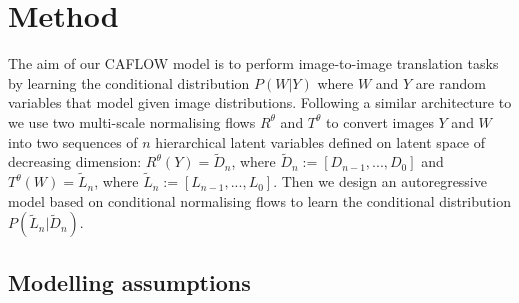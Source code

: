 \section{Method}\label{ch1:sec:Caflow}
The aim of our CAFLOW model is to perform image-to-image translation tasks by learning the conditional distribution $P(W|Y)$ where $W$ and $Y$ are random variables that model given image distributions.
Following a similar architecture to \cite{Dual-Glow} we use two multi-scale normalising flows $R^\theta$ and $T^\theta$ to convert images $Y$ and $W$ into two sequences of $n$ hierarchical latent variables defined on latent space of decreasing dimension: \(R^\theta(Y)=\tilde{D}_n\), where \(\tilde{D}_n:=[D_{n-1}, ..., D_0]\) and \(T^\theta(W)=\tilde{L}_n\), where \(\tilde{L}_n := [L_{n-1}, ..., L_0]\). Then we design an autoregressive model based on conditional normalising flows to learn the conditional distribution $P(\tilde{L}_n| \tilde{D}_n)$.

\subsection{Modelling assumptions}\label{ch1:subsec:modass}

